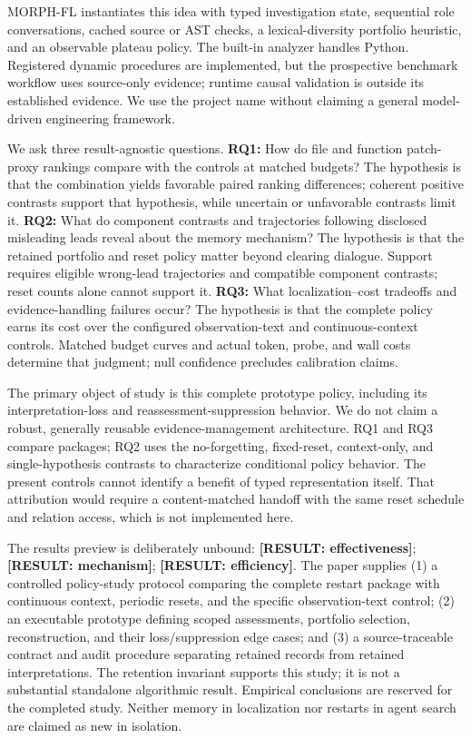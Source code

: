 \documentclass[letterpaper,journal]{IEEEtran}
\makeatletter
\newcommand{\resultslot}[1]{\textcolor{blue!65!black}{\textbf{[RESULT: #1]}}}
\newcommand{\claimslot}[1]{\resultslot{#1}}
\newcommand{\boundresult}[1]{\ifcsname result@#1\endcsname\csname result@#1\endcsname\else\PackageError{morph-results}{Missing result key #1}{Supply audited binding}\fi}
\newcommand{\claimslot}[1]{\boundresult{#1}}
\newcommand{\tool}{MORPH-FL}
\makeatother
\begin{document}
\tool{} instantiates this idea with typed investigation state, sequential role conversations, cached source or AST checks, a lexical-diversity portfolio heuristic, and an observable plateau policy. The built-in analyzer handles Python. Registered dynamic procedures are implemented, but the prospective benchmark workflow uses source-only evidence; runtime causal validation is outside its established evidence. We use the project name without claiming a general model-driven engineering framework.

We ask three result-agnostic questions. \textbf{RQ1:} How do file and function patch-proxy rankings compare with the controls at matched budgets? The hypothesis is that the combination yields favorable paired ranking differences; coherent positive contrasts support that hypothesis, while uncertain or unfavorable contrasts limit it. \textbf{RQ2:} What do component contrasts and trajectories following disclosed misleading leads reveal about the memory mechanism? The hypothesis is that the retained portfolio and reset policy matter beyond clearing dialogue. Support requires eligible wrong-lead trajectories and compatible component contrasts; reset counts alone cannot support it. \textbf{RQ3:} What localization--cost tradeoffs and evidence-handling failures occur? The hypothesis is that the complete policy earns its cost over the configured observation-text and continuous-context controls. Matched budget curves and actual token, probe, and wall costs determine that judgment; null confidence precludes calibration claims.

The primary object of study is this complete prototype policy, including its interpretation-loss and reassessment-suppression behavior. We do not claim a robust, generally reusable evidence-management architecture. RQ1 and RQ3 compare packages; RQ2 uses the no-forgetting, fixed-reset, context-only, and single-hypothesis contrasts to characterize conditional policy behavior. The present controls cannot identify a benefit of typed representation itself. That attribution would require a content-matched handoff with the same reset schedule and relation access, which is not implemented here.

The results preview is deliberately unbound: \claimslot{effectiveness}; \claimslot{mechanism}; \claimslot{efficiency}. The paper supplies (1) a controlled policy-study protocol comparing the complete restart package with continuous context, periodic resets, and the specific observation-text control; (2) an executable prototype defining scoped assessments, portfolio selection, reconstruction, and their loss/suppression edge cases; and (3) a source-traceable contract and audit procedure separating retained records from retained interpretations. The retention invariant supports this study; it is not a substantial standalone algorithmic result. Empirical conclusions are reserved for the completed study. Neither memory in localization nor restarts in agent search are claimed as new in isolation.
\end{document}
